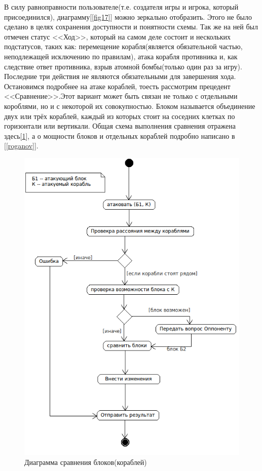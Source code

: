 В силу равноправности пользователе(т.е. создателя игры и игрока, который присоединился), диаграмму[\ref{fig17}] можно зеркально отобразить. Этого не было сделано в целях сохранения доступности и понятности схемы. Так же на ней был отмечен статус <<Ход>>, который на самом деле состоит и нескольких подстатусов, таких как: перемещение корабля(является обязательной частью, неподлежащей исключению по правилам), атака корабля противника и, как следствие ответ противника, взрыв атомной бомбы(только один раз за игру). Последние три действия не являются обязательными для завершения хода. Остановимся подробнее на атаке кораблей, тоесть рассмотрим прецедент <<Сравнение>>.Этот вариант может быть связан не только с отдельными короблями, но и с некоторой их совокупностью. Блоком называется объединение двух или трёх кораблей, каждый из которых стоит на соседних клетках по горизонтали или вертикали. Общая схема выполнения сравнения отражена здесь[\ref{fig18}], а о мощности блоков и отдельных кораблей подробно написано в [\ref{roganov}].
\begin{figure}[htp]
\centering
\includegraphics[width=12cm]{images/ask.png}
\caption{Диаграмма сравнения блоков(кораблей)}
\label{fig18}
\end{figure}
\endinput
